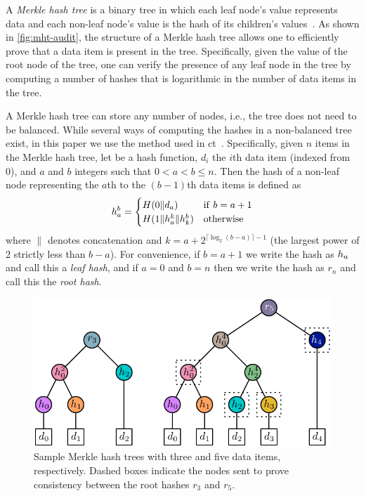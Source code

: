 A \emph{Merkle hash tree} is a binary tree in which each leaf node's value
represents data and each non-leaf node's value is the hash of its children's
values~\cite{merkle1988digital}. As shown in \autoref{fig:mht-audit}, the
structure of a Merkle hash tree allows one to efficiently prove that a data item
is present in the tree. Specifically, given the value of the root node of the
tree, one can verify the presence of any leaf node in the tree by computing a
number of hashes that is logarithmic in the number of data items in the tree.

A Merkle hash tree can store any number of nodes, i.e., the tree does not need
to be balanced. While several ways of computing the hashes in a non-balanced
tree exist, in this paper we use the method used in \ac{ct}~\cite{rfc6962}.
Specifically, given $n$ items in the Merkle hash tree, let \hashfunc be a hash
function, $d_i$ the $i$th data item (indexed from 0), and $a$ and $b$ integers
such that $0 < a < b \le n$. Then the hash of a non-leaf node representing the
$a$th to the $(b-1)$th data items is defined as
\begin{equation}
  h_a^b =
  \begin{cases}
    H(0 \| d_a) & \mathrm{if\ } b = a + 1 \\
    H(1 \| h_a^k \| h_k^b) & \mathrm{otherwise}
  \end{cases}
\end{equation}
where $\|$ denotes concatenation and $k = a + 2^{\lceil \log_2(b-a) \rceil - 1}$
(the largest power of 2 strictly less than $b - a$). For convenience, if $b = a
+ 1$ we write the hash as $h_a$ and call this a \emph{leaf hash}, and if
$a = 0$ and $b = n$ then we write the hash as $r_n$ and call this the \emph{root
hash}.

\begin{figure}
  \centering
  \includegraphics[width=\linewidth]{fig/mht-consistency}
  \caption{Sample Merkle hash trees with three and five data items,
  respectively. Dashed boxes indicate the nodes sent to prove consistency
between the root hashes $r_3$ and $r_5$.}
  \label{fig:mht-consistency}
\end{figure}

